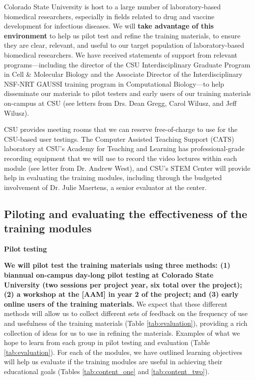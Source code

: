 \documentclass[pdftex,english,11pt,parskip=half]{scrartcl}
\begin{document}
Colorado State University is host to a large number of laboratory-based
biomedical researchers, especially in fields related to drug and vaccine
development for infectious diseases. We will \textbf{take advantage of this
environment} to help us pilot test and refine the training materials, to ensure
they are clear, relevant, and useful to our target population of
laboratory-based biomedical researchers. We have received statements of support
from relevant programs---including the director of the CSU Interdisciplinary
Graduate Program in Cell \& Molecular Biology and the Associate Director of the
Interdisciplinary NSF-NRT GAUSSI training program in Computational Biology---to
help disseminate our materials to pilot testers and early users of our training
materials on-campus at CSU (see letters from Drs. Dean Gregg, Carol Wilusz, and Jeff
Wilusz). 

CSU provides meeting rooms
that we can reserve free-of-charge to use for the CSU-based user testings. The
Computer Assisted Teaching Support (CATS) laboratory at CSU's Academy for
Teaching and Learning has professional-grade recording equipment that we will
use to record the video lectures within each module (see letter from Dr. Andrew
West), and CSU's STEM Center will provide help in evaluating the training modules,
including through the budgeted involvement of Dr. Julie Maertens, a senior
evaluator at the center. 

\subsection{Piloting and evaluating the effectiveness of the training modules}

\textbf{Pilot testing}

\textbf{We will pilot test the training materials using three methods: (1) biannual on-campus  day-long pilot testing at Colorado State University (two sessions per project year, six total over the project); (2) a workshop at the [AAM] in year 2 of the project; and (3) early online users of the training materials.} We expect that these different methods will allow us to collect different sets of 
feedback on the frequency of use and usefulness of the training materials (Table \ref{tab:evaluation}), providing a rich collection of ideas for us to use in refining the materials. Examples of what we hope to learn from each group in pilot testing and evaluation (Table \ref{tab:evaluation}). For each of the modules, we have outlined learning objectives will help us evaluate if the training modules are useful in achieving their educational goals (Tables \ref{tab:content_one} and \ref{tab:content_two}).
\end{document}
